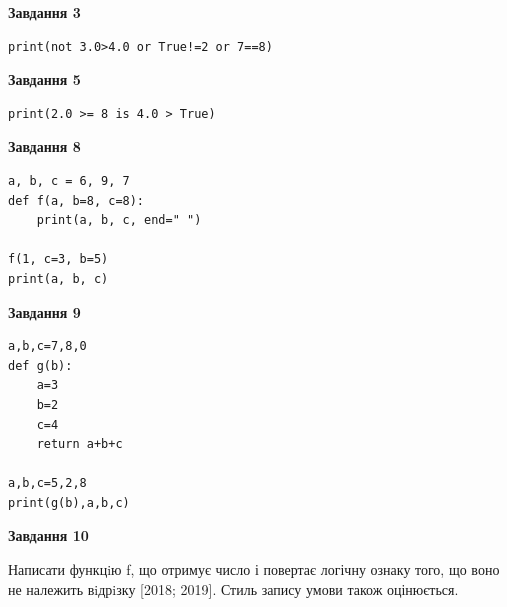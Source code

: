 \documentclass[12pt, ukrainian]{article}
\begin{document}
{\begin {large}
\begin{minipage}[t]{7.5cm}
\end{minipage}
\vline \hspace{6mm}
\begin{minipage}[t]{10.5cm}

\begin{center}
\textbf{Завдання 3}
\end{center}

\begin{verbatim}
print(not 3.0>4.0 or True!=2 or 7==8)
\end{verbatim}



\begin{center}
\textbf{Завдання 5}
\end{center}

\begin{verbatim}
print(2.0 >= 8 is 4.0 > True)
\end{verbatim}



\begin{center}
\textbf{Завдання 8}
\end{center}

\begin{verbatim}
a, b, c = 6, 9, 7
def f(a, b=8, c=8):
    print(a, b, c, end=" ")

f(1, c=3, b=5)
print(a, b, c)
\end{verbatim}



\begin{center}
\textbf{Завдання 9}
\end{center}

\begin{verbatim}
a,b,c=7,8,0
def g(b):
    a=3
    b=2
    c=4
    return a+b+c

a,b,c=5,2,8
print(g(b),a,b,c)
\end{verbatim}



\begin{center}
\textbf{Завдання 10}
\end{center}

Написати функцiю f, що отримує число і повертає логічну ознаку того, що воно не належить вiдрiзку [2018; 2019]. Стиль запису умови також оцінюється.\par

\end{minipage}

\end {large}}
\newpage
\end{document}
